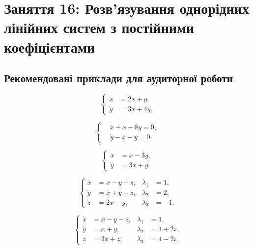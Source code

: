 \section*{Заняття 16: Розв'язування однорідних лінійних систем з постійними коефіцієнтами}

\subsection*{Рекомендовані приклади для аудиторної роботи}

\begin{problem}
	\[ \left\{ \begin{aligned} \dot x &= 2 x + y, \\ \dot y &= 3 x + 4 y. \end{aligned} \right. \]
\end{problem}

\begin{problem}
	\[ \left\{ \begin{aligned} & \dot x + x - 8 y = 0, \\ & \dot y - x - y = 0. \end{aligned} \right. \]
\end{problem}

\begin{problem}
	\[ \left\{ \begin{aligned} \dot x &= x - 3 y, \\ \dot y &= 3 x + y. \end{aligned} \right. \]
\end{problem}

\begin{problem}
	\[ \left\{ \begin{aligned} \dot x &= x - y + z, & \lambda_1 &= 1, \\ \dot y &= x + y - z, & \lambda_2 &= 2, \\ \dot z &= 2 x - y, & \lambda_3 &= - 1. \end{aligned} \right. \]
\end{problem}

\begin{problem}
	\[ \left\{ \begin{aligned} \dot x &= x - y - z, & \lambda_1 &= 1, \\ \dot y &= x + y, & \lambda_2 &= 1 + 2 i, \\ \dot z &= 3 x + z, & \lambda_3 &= 1 - 2 i. \end{aligned} \right. \]
\end{problem}

